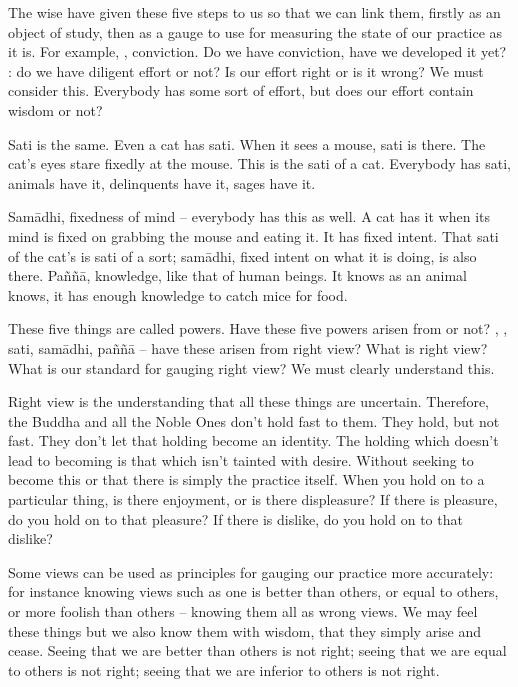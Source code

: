 The wise have given these five steps to us so that we can link them, firstly as an object of study, then as a gauge to use for measuring the state of our practice as it is. For example, , conviction. Do we have conviction, have we developed it yet? : do we have diligent effort or not? Is our effort right or is it wrong? We must consider this. Everybody has some sort of effort, but does our effort contain wisdom or not? 

Sati is the same. Even a cat has sati. When it sees a mouse, sati is there. The cat's eyes stare fixedly at the mouse. This is the sati of a cat. Everybody has sati, animals have it, delinquents have it, sages have it. 

Sam\=adhi, fixedness of mind -- everybody has this as well. A cat has it when its mind is fixed on grabbing the mouse and eating it. It has fixed intent. That sati of the cat's is sati of a sort; sam\=adhi, fixed intent on what it is doing, is also there. Pa\~n\~n\=a, knowledge, like that of human beings. It knows as an animal knows, it has enough knowledge to catch mice for food. 

These five things are called powers. Have these five powers arisen from  or not? , , sati, sam\=adhi, pa\~n\~n\=a -- have these arisen from right view? What is right view? What is our standard for gauging right view? We must clearly understand this. 

Right view is the understanding that all these things are uncertain. Therefore, the Buddha and all the Noble Ones don't hold fast to them. They hold, but not fast. They don't let that holding become an identity. The holding which doesn't lead to becoming is that which isn't tainted with desire. Without seeking to become this or that there is simply the practice itself. When you hold on to a particular thing, is there enjoyment, or is there displeasure? If there is pleasure, do you hold on to that pleasure? If there is dislike, do you hold on to that dislike? 

Some views can be used as principles for gauging our practice more accurately: for instance knowing views such as one is better than others, or equal to others, or more foolish than others -- knowing them all as wrong views. We may feel these things but we also know them with wisdom, that they simply arise and cease. Seeing that we are better than others is not right; seeing that we are equal to others is not right; seeing that we are inferior to others is not right. 

